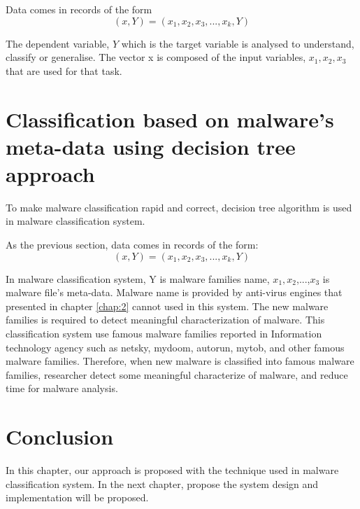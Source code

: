 Data comes in records of the form
\begin{equation}
    (x,Y) = (x_1, x_2, x_3, ..., x_k, Y) 
\end{equation}

The dependent variable, $Y$ which is the target variable is analysed to understand, classify or generalise. The vector x is composed of the input variables, $x_{1}, x_{2}, x_{3}$ that are used for that task.
\section{Classification based on malware's meta-data using decision tree approach}

To make malware classification rapid and correct, decision tree algorithm is used in malware classification system.

As the previous section, data comes in records of the form:
\begin{equation}
    (x,Y) = (x_1, x_2, x_3, ..., x_k, Y) 
\end{equation}

In malware classification system, Y is malware families name, $x_{1}, x_{2}$,...,$x_{3}$ is malware file's meta-data. Malware name is provided by anti-virus engines that presented in chapter \ref{chap:2} cannot used in this system. The new malware families is required to detect meaningful characterization of malware. This classification system use famous malware families reported in Information technology agency such as netsky, mydoom, autorun, mytob, and other famous malware families. Therefore, when new malware is classified into famous malware families, researcher detect some meaningful characterize of malware, and reduce time for malware analysis. 
\section{Conclusion}
In this chapter, our approach is proposed with the technique used in malware classification system.
In the next chapter, propose the system design and implementation will be proposed.